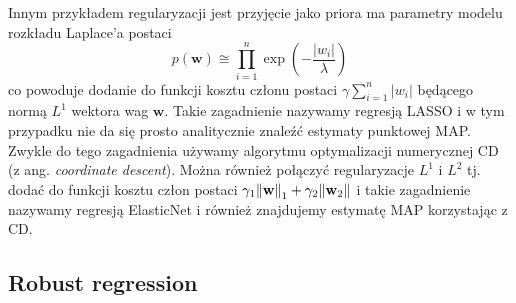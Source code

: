 \documentclass{myclass}
\begin{document}
Innym przykładem regularyzacji jest przyjęcie jako priora ma parametry modelu rozkładu Laplace'a
postaci
\begin{equation*}
    p(\mathbf{w}) \cong \prod_{i=1}^n \exp\left(-\frac{|w_i|}{\lambda}\right)
\end{equation*}
co powoduje dodanie do funkcji kosztu członu postaci \(\gamma \sum_{i=1}^n |w_i|\) będącego normą
\(L^1\) wektora wag \(\mathbf{w}\). Takie zagadnienie nazywamy regresją LASSO i w tym przypadku nie
da się prosto analitycznie znaleźć estymaty punktowej MAP. Zwykle do tego zagadnienia używamy
algorytmu optymalizacji numerycznej CD (z ang. \textit{coordinate descent}). Można również połączyć
regularyzacje \(L^1\) i \(L^2\) tj. dodać do funkcji kosztu człon postaci \(\gamma_1
\norm{\mathbf{w}}_1 + \gamma_2 \norm{\mathbf{w}_2}\) i takie zagadnienie nazywamy regresją
ElasticNet i również znajdujemy estymatę MAP korzystając z CD.

\subsection{Robust regression}
\end{document}

